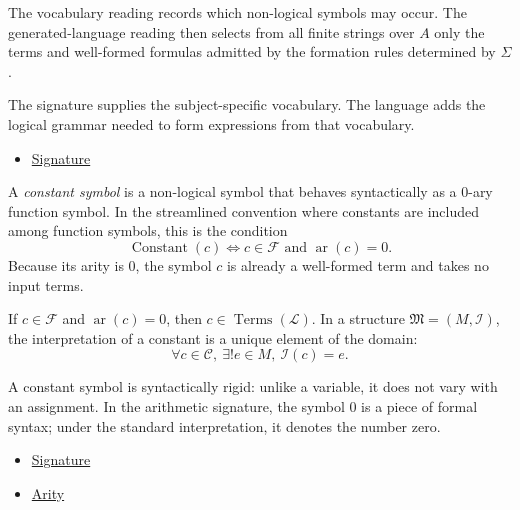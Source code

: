 \begin{remark*}
The vocabulary reading records which non-logical symbols may occur. The
generated-language reading then selects from all finite strings over $A$ only
the terms and well-formed formulas admitted by the formation rules determined
by $\Sigma$.
\end{remark*}

\begin{remark*}[Interpretation]
The signature supplies the subject-specific vocabulary. The language adds the
logical grammar needed to form expressions from that vocabulary.
\end{remark*}

\begin{dependencies}
\begin{itemize}
  \item \hyperref[def:signature]{Signature}
\end{itemize}
\end{dependencies}

\begin{definition}
\label{def:signature-constant-symbol}
A \emph{constant symbol} is a non-logical symbol that behaves syntactically as
a $0$-ary function symbol. In the streamlined convention where constants are
included among function symbols, this is the condition
\[
  \operatorname{Constant}(c)
  \iff c\in\mathcal{F}\text{ and }\operatorname{ar}(c)=0.
\]
Because its arity is $0$, the symbol $c$ is already a well-formed term and
takes no input terms.
\end{definition}

\begin{remark*}
If $c\in\mathcal{F}$ and $\operatorname{ar}(c)=0$, then
$c\in\operatorname{Terms}(\mathcal{L})$. In a structure
$\mathfrak{M}=(M,\mathcal{I})$, the interpretation of a constant is a unique
element of the domain:
\[
  \forall c\in\mathcal{C},\ \exists! e\in M,\ \mathcal{I}(c)=e.
\]
\end{remark*}

\begin{remark*}[Interpretation]
A constant symbol is syntactically rigid: unlike a variable, it does not vary
with an assignment. In the arithmetic signature, the symbol $0$ is a piece of
formal syntax; under the standard interpretation, it denotes the number zero.
\end{remark*}

\begin{dependencies}
\begin{itemize}
  \item \hyperref[def:signature]{Signature}
  \item \hyperref[def:arity]{Arity}
\end{itemize}
\end{dependencies}

